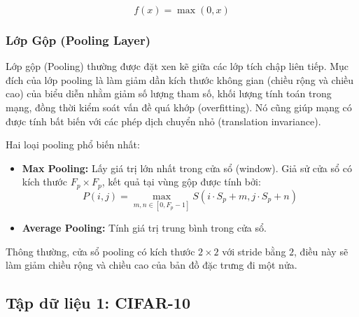 \begin{equation}
    f(x) = \max(0, x)
\end{equation}

\subsubsection{Lớp Gộp (Pooling Layer)}

Lớp gộp (Pooling) thường được đặt xen kẽ giữa các lớp tích chập liên tiếp. Mục đích của lớp pooling là làm giảm dần kích thước không gian (chiều rộng và chiều cao) của biểu diễn nhằm giảm số lượng tham số, khối lượng tính toán trong mạng, đồng thời kiểm soát vấn đề quá khớp (overfitting). Nó cũng giúp mạng có được tính bất biến với các phép dịch chuyển nhỏ (translation invariance).

Hai loại pooling phổ biến nhất:
\begin{itemize}
    \item \textbf{Max Pooling:} Lấy giá trị lớn nhất trong cửa sổ (window). Giả sử cửa sổ có kích thước $F_p \times F_p$, kết quả tại vùng gộp được tính bởi:
    \begin{equation}
        P(i, j) = \max_{m, n \in [0, F_p-1]} S(i \cdot S_p + m, j \cdot S_p + n)
    \end{equation}
    \item \textbf{Average Pooling:} Tính giá trị trung bình trong cửa sổ.
\end{itemize}

Thông thường, cửa sổ pooling có kích thước $2 \times 2$ với stride bằng $2$, điều này sẽ làm giảm chiều rộng và chiều cao của bản đồ đặc trưng đi một nửa.

\newpage
\subsection{Tập dữ liệu 1: CIFAR-10}

